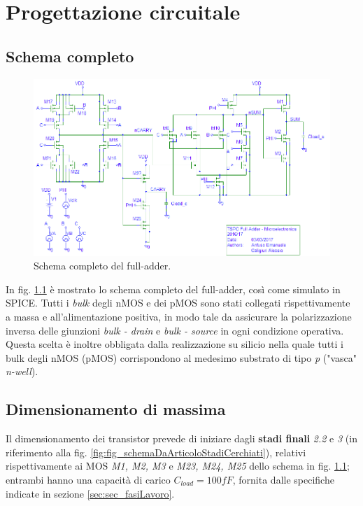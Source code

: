 
\chapter{Progettazione circuitale} %
\label{Chapter3} 

\section{Schema completo}
\begin{figure}[hbt!]
	\centering
	\includegraphics[width=1\textwidth]{figure/TSPC_FA_SchematicScreen.png}
	\caption{Schema completo del full-adder.}
	\label{fig:schemaCircuitale}
	\end{figure}
In fig. \ref{fig:schemaCircuitale} è mostrato lo schema completo del full-adder, così come simulato in SPICE. Tutti i \textit{bulk} degli nMOS e dei pMOS sono stati collegati rispettivamente a massa e all'alimentazione positiva, in modo tale da assicurare la polarizzazione inversa delle giunzioni \textit{bulk - drain} e \textit{bulk - source} in ogni condizione operativa. Questa scelta è inoltre obbligata dalla realizzazione su silicio nella quale tutti i bulk degli nMOS (pMOS) corrispondono al medesimo substrato di tipo \textit{p} ("vasca" \textit{n-well}).

\section{Dimensionamento di massima}
\label{sec:sec_dimensionamentoMassima}
Il dimensionamento dei transistor prevede di iniziare dagli \textbf{stadi finali} \textit{2.2} e \textit{3} (in riferimento alla fig. \ref{fig:fig_schemaDaArticoloStadiCerchiati}), relativi rispettivamente ai MOS \textit{M1, M2, M3} e\textit{ M23, M24, M25} dello schema in fig. \ref{fig:schemaCircuitale}; entrambi hanno una capacità di carico $C_{load} = 100fF$, fornita dalle specifiche indicate in sezione \ref{sec:sec_fasiLavoro}.

